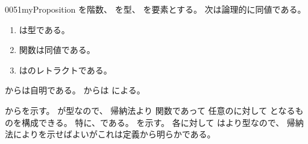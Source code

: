 \documentclass[index]{subfiles}
\begin{document}
\begin{myBlock}{0051}{myProposition}
  を階数、
  を型、
  を要素とする。
  次は論理的に同値である。
  \begin{enumerate}
  \item \label{0051:0000} は型である。
  \item \label{0051:0001}
    関数は同値である。
  \item \label{0051:0002}
    はのレトラクトである。
  \end{enumerate}
\end{myBlock}
\begin{myProof}
  からは自明である。
  からは
  による。

  からを示す。
  が型なので、
  帰納法より
  関数であって
  任意のに対して
  となるものを構成できる。
  特に、である。
  を示す。
  各に対して
  はより型なので、
  帰納法によりを示せばよいがこれは定義から明らかである。
\end{myProof}
\end{document}
